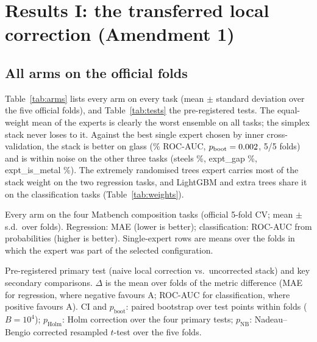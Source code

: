 \section{Results I: the transferred local correction (Amendment 1)}
\label{sec:results}

\subsection{All arms on the official folds}
Table~\ref{tab:arms} lists every arm on every task (mean $\pm$ standard deviation over the five official folds), and Table~\ref{tab:tests} the pre-registered tests.
The equal-weight mean of the experts is clearly the worst ensemble on all tasks; the simplex stack never loses to it.
Against the best single expert chosen by inner cross-validation, the stack is better on glass (\GlassStackVsBestSingleRel\% ROC-AUC, $p_\mathrm{boot}=0.002$, 5/5 folds) and is within noise on the other three tasks (steels \SteelsStackVsBestSingleRel\%, expt\_gap \GapStackVsBestSingleRel\%, expt\_is\_metal \MetalStackVsBestSingleRel\%).
The extremely randomised trees expert carries most of the stack weight on the two regression tasks, and LightGBM and extra trees share it on the classification tasks (Table~\ref{tab:weights}).

\begin{table}[t]
\centering
\caption{Every arm on the four Matbench composition tasks (official 5-fold CV; mean $\pm$ s.d.\ over folds). Regression: MAE (lower is better); classification: ROC-AUC from probabilities (higher is better). Single-expert rows are means over the folds in which the expert was part of the selected configuration.}
\label{tab:arms}
\begin{adjustbox}{max width=\textwidth}

\end{adjustbox}
\end{table}

\begin{table}[t]
\centering
\caption{Pre-registered primary test (naive local correction vs.\ uncorrected stack) and key secondary comparisons. $\Delta$ is the mean over folds of the metric difference (MAE for regression, where negative favours A; ROC-AUC for classification, where positive favours A). CI and $p_\mathrm{boot}$: paired bootstrap over test points within folds ($B=10^4$); $p_\mathrm{Holm}$: Holm correction over the four primary tests; $p_\mathrm{NB}$: Nadeau--Bengio corrected resampled $t$-test over the five folds.}
\label{tab:tests}
\begin{adjustbox}{max width=\textwidth}

\end{adjustbox}
\end{table}

